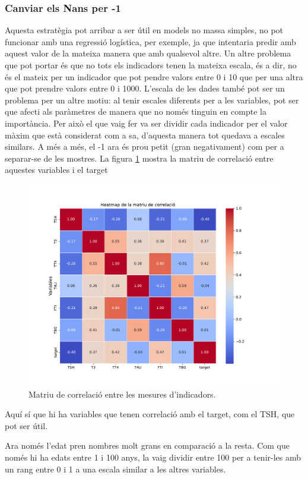 \documentclass[9pt,a4paper,twoside]{tau-class/tau}
\begin{document}
    \subsubsection{Canviar els Nans per -1}
    Aquesta estratègia pot arribar a ser útil en models no massa simples, no pot funcionar amb una regressió logística, per exemple, ja que intentaria predir amb aquest valor de la mateixa manera que amb qualsevol altre. Un altre problema que pot portar és que no tots els indicadors tenen la mateixa escala, és a dir, no és el mateix per un indicador que pot pendre valors entre 0 i 10 que per una altra que pot prendre valors entre 0 i 1000. L'escala de les dades també pot ser un problema per un altre motiu: al tenir escales diferents per a les variables, pot ser que afecti als paràmetres de manera que no només tinguin en compte la importància. Per això el que vaig fer va ser dividir cada indicador per el valor màxim que està considerat com a sa, d'aquesta manera tot quedava a escales similars. A més a més, el -1 ara és prou petit (gran negativament) com per a separar-se de les mostres. La figura \ref{fig:figure4} mostra la matriu de correlació entre aquestes variables i el target
    \begin{figure}[H]
		\centering
		\includegraphics[width=0.75\columnwidth]{correlation_matrix_atributs_df_fillna.pdf}
		\caption{Matriu de correlació entre les mesures d'indicadors.}
		\label{fig:figure4}
	\end{figure}

    Aquí sí que hi ha variables que tenen correlació amb el target, com el TSH, que pot ser útil.

    Ara només l'edat pren nombres molt grans en comparació a la resta. Com que només hi ha edats entre 1 i 100 anys, la vaig dividir entre 100 per a tenir-les amb un rang entre 0 i 1 a una escala similar a les altres variables.
\end{document}
